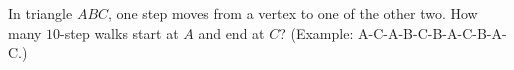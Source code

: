 In triangle $ABC$, one step moves from a vertex to one of the other two. How many $10$-step walks start at $A$ and end at $C$? (Example: A-C-A-B-C-B-A-C-B-A-C.)

